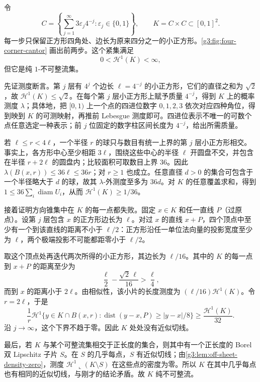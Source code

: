 \begin{example}[四角 Cantor 集]\label{g3:exm:four-corner-cantor}
	令
	\[
		C=\left\{\sum_{j=1}^{\infty}3\varepsilon_j4^{-j}:
		\varepsilon_j\in\{0,1\}\right\},\qquad K=C\times C\subset[0,1]^2.
	\]
	每一步只保留正方形四角处、边长为原来四分之一的小正方形。\cref{g3:fig:four-corner-cantor} 画出前两步。这个紧集满足
	\[
		0<\mathcal H^1(K)<\infty,
	\]
	但它是纯 \(1\)-不可整流集。

	先证测度断言。第 \(j\) 层有 \(4^j\) 个边长 \(\ell=4^{-j}\) 的小正方形，它们的直径之和为 \(\sqrt2\)，故 \(\mathcal H^1(K)\le\sqrt2\)。在每个第 \(j\) 层小正方形上赋予质量 \(4^{-j}\)，得到 \(K\) 上的概率测度 \(\lambda\)；具体地，把 \([0,1)\) 上一个点的四进位数字 \(0,1,2,3\) 依次对应四种角位，得到映到 \(K\) 的可测映射，再推前 Lebesgue 测度即可。四进位表示不唯一的可数个点任意选定一种表示；前 \(j\) 位固定的数字柱区间长度为 \(4^{-j}\)，给出所需质量。

	若 \(\ell\le r<4\ell\)，一个半径 \(r\) 的球只与数目有统一上界的第 \(j\) 层小正方形相交。事实上，各方形中心至少相距 \(3\ell\)，围绕这些中心的半径 \(\ell\) 开圆盘不交，并包含在半径 \(r+2\ell\) 的圆盘内；比较面积可取数目上界 \(36\)。因此
	\(\lambda(B(x,r))\le36\ell\le36r\)；对 \(r\ge1\) 也成立。任意直径 \(d>0\) 的集合可包含于一个半径略大于 \(d\) 的球，故其 \(\lambda\)-外测度至多为 \(36d\)。对 \(K\) 的任意覆盖求和，得到
	\(1\le36\sum_i\operatorname{diam}U_i\)，从而 \(\mathcal H^1(K)\ge1/36\)。

	接着证明方向锥集中在 \(K\) 的每一点都失败。固定 \(x\in K\) 和任一直线 \(P\)（过原点）。设第 \(j\) 层包含 \(x\) 的正方形边长为 \(\ell\)。对过 \(x\) 的直线 \(x+P\)，四个顶点中至少有一个到该直线的距离不小于 \(\ell/2\)：正方形沿任一单位法向量的投影宽度至少为 \(\ell\)，两个极端投影不可能都距零小于 \(\ell/2\)。

	取这个顶点处再迭代两次所得的小正方形，其边长为 \(\ell/16\)。其中的 \(K\) 的每一点到 \(x+P\) 的距离至少为
	\[
		\frac{\ell}{2}-\frac{\sqrt2\,\ell}{16}>\frac{\ell}{4},
	\]
	而到 \(x\) 的距离小于 \(2\ell\)。由相似性，该小片的长度测度为 \((\ell/16)\mathcal H^1(K)\)。令 \(r=2\ell\)，于是
	\[
		\frac1r\mathcal H^1
		\{y\in K\cap B(x,r):\operatorname{dist}(y-x,P)\ge |y-x|/8\}
		\ge\frac{\mathcal H^1(K)}{32}.
	\]
	沿 \(j\to\infty\)，这个下界不趋于零。因此 \(K\) 处处没有近似切线。

	最后，若 \(K\) 与某个可整流集相交于正长度的集合，则其中有一个正长度的 Borel 双 Lipschitz 子片 \(S\)。在 \(S\) 的几乎每点，\(S\) 有近似切线；由\cref{g3:lem:off-sheet-density-zero}，测度
	\(\mathcal H^1\llcorner(K\setminus S)\) 在这些点的密度为零。所以 \(K\) 在其中几乎每点也有相同的近似切线，与刚才的结论矛盾。故 \(K\) 纯不可整流。
\end{example}


